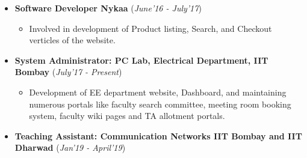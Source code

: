 \documentclass[10pt]{article}
\begin{document}
\colorbox{bl}{}
\vspace{-0.55cm}
\begin{itemize}[leftmargin=0.4cm]
	\item \textbf{Software Developer \textpipe  \hspace{0.05cm} Nykaa} \hfill{(\textit{June'16 - July'17})}\\
	\vspace{-0.65cm}
	\begin{itemize}
		\item Involved in development of Product listing, Search, and Checkout verticles of the website.
	\end{itemize}
	\item \textbf{System Administrator:\hspace{0.05cm} PC Lab, Electrical Department, IIT Bombay} \hfill{(\textit{July'17 - Present})}\\
	\vspace{-0.65cm}
	\begin{itemize}
		\item Development of EE department website, Dashboard, and maintaining numerous portals like faculty search committee, meeting room booking system, faculty wiki pages and TA allotment portals.
	\end{itemize}
	
	\item \textbf{Teaching Assistant:\hspace{0.05cm} Communication Networks IIT Bombay and IIT Dharwad} \hfill{(\textit{Jan'19 - April'19})}\\
	\vspace{-0.5cm}
\end{itemize}
\end{document}
